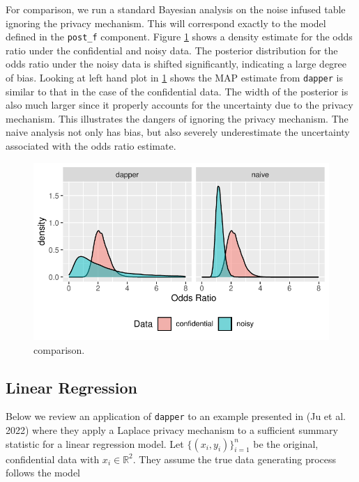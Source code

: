 For comparison, we run a standard Bayesian analysis on the
noise infused table ignoring the privacy mechanism. This will
correspond exactly to the model defined in the \texttt{post\_f} component.
Figure \ref{fig:post-or-compare} shows a density estimate for the odds ratio
under the confidential and noisy data. The posterior
distribution for the odds ratio under the noisy data
is shifted significantly, indicating a large degree of bias.
Looking at left hand plot in \ref{fig:post-or-compare} shows the MAP estimate from \texttt{dapper}
is similar to that in the case of the confidential data.
The width of the posterior is also much larger since
it properly accounts for the uncertainty due to the privacy mechanism. This
illustrates the dangers of ignoring the privacy mechanism. The naive
analysis not only has bias, but also severely underestimate the
uncertainty associated with the odds ratio estimate.

\begin{figure}

{\centering \includegraphics{dppaper_files/figure-latex/post-or-compare-1} 

}

\caption{comparison.}\label{fig:post-or-compare}
\end{figure}

\hypertarget{linear-regression}{%
\subsection{Linear Regression}\label{linear-regression}}

Below we review an application of \texttt{dapper} to an example
presented in (Ju et al. 2022) where they apply a Laplace privacy
mechanism to a sufficient summary statistic for a linear regression model.
Let \(\{(x_i,y_i)\}_{i=1}^{n}\) be the original, confidential data with \(x_i \in \mathbb{R}^2\).
They assume the true data generating process follows the model


